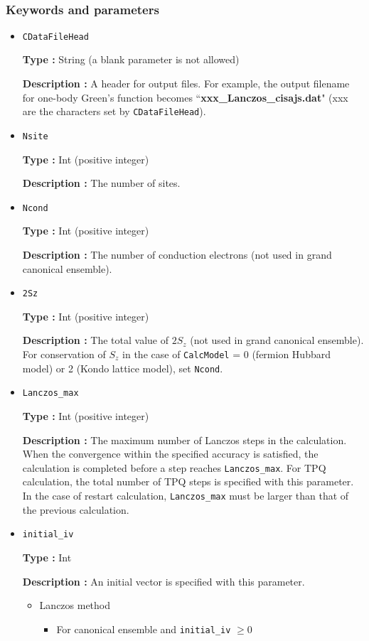 ~\subsubsection{Keywords and parameters}
 \begin{itemize}
  \item  \verb|CDataFileHead|

 {\bf Type :} String (a blank parameter is not allowed)

{\bf Description :} A header for output files. For example, the output filename for one-body Green's function becomes ``{\bf xxx\_Lanczos\_cisajs.dat}" (xxx are the characters set by \verb|CDataFileHead|). 
   
 \item  \verb|Nsite|

{\bf Type :} Int (positive integer)

{\bf Description :} The number of sites.  


 \item  \verb|Ncond|

{\bf Type :} {Int (positive integer)}

{\bf Description :} {The number of conduction electrons (not used in grand canonical ensemble). }

 \item  \verb|2Sz|

{\bf Type :} {Int (positive integer)}

{\bf Description :} {The total value of $2S_z$ (not used in grand canonical ensemble). For conservation of $S_z$ in the case of } \verb|CalcModel| = 0 (fermion Hubbard model) or 2 (Kondo lattice model), set \verb|Ncond|.

 \item  \verb|Lanczos_max|

{\bf Type :} Int (positive integer)

{\bf Description :}  The maximum number of Lanczos steps in the calculation. When the convergence within the specified accuracy is satisfied, the calculation is completed before a step reaches  \verb|Lanczos_max|. For TPQ calculation, the total number of TPQ steps is specified with this parameter. In the case of restart calculation, \verb|Lanczos_max| must be larger than that of the previous calculation.

 \item  \verb|initial_iv|

{\bf Type :} Int

{\bf Description :} 
{An initial vector is specified with this parameter.}
\begin{itemize}
\item{Lanczos method}
\begin{itemize}
\item{For canonical ensemble and \verb|initial_iv| $\geq 0$}


\end{itemize}
\end{itemize}
\end{itemize}
